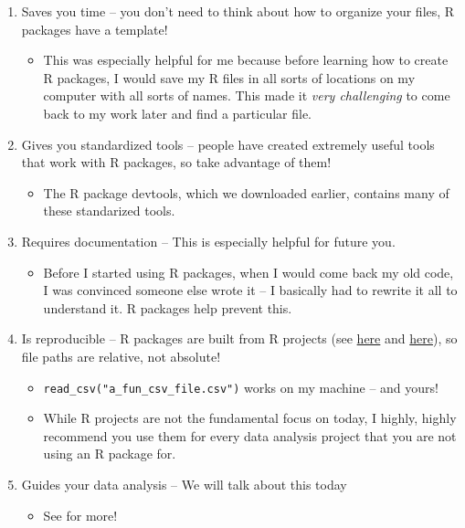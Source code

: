 \documentclass[
]{book}
\providecommand{\tightlist}{%
  \setlength{\itemsep}{0pt}\setlength{\parskip}{0pt}}
\begin{document}
\begin{enumerate}
\def\labelenumi{\arabic{enumi}.}
\tightlist
\item
  Saves you time -- you don't need to think about how to organize your files, R packages have a template!

  \begin{itemize}
  \tightlist
  \item
    This was especially helpful for me because before learning how to create R packages, I would save my R files in all sorts of locations on my computer with all sorts of names. This made it \emph{very challenging} to come back to my work later and find a particular file.
  \end{itemize}
\item
  Gives you standardized tools -- people have created extremely useful tools that work with R packages, so take advantage of them!

  \begin{itemize}
  \tightlist
  \item
    The R package devtools, which we downloaded earlier, contains many of these standarized tools.
  \end{itemize}
\item
  Requires documentation -- This is especially helpful for future you.

  \begin{itemize}
  \tightlist
  \item
    Before I started using R packages, when I would come back my old code, I was convinced someone else wrote it -- I basically had to rewrite it all to understand it. R packages help prevent this.
  \end{itemize}
\item
  Is reproducible -- R packages are built from R projects (see \href{https://r4ds.had.co.nz/workflow-projects.html}{here} and \href{https://support.rstudio.com/hc/en-us/articles/200526207-Using-Projects}{here}), so file paths are relative, not absolute!

  \begin{itemize}
  \tightlist
  \item
    \texttt{read\_csv("a\_fun\_csv\_file.csv")} works on my machine -- and yours!
  \item
    While R projects are not the fundamental focus on today, I highly, highly recommend you use them for every data analysis project that you are not using an R package for.
  \end{itemize}
\item
  Guides your data analysis -- We will talk about this today

  \begin{itemize}
  \tightlist
  \item
    See \citet{marwick2018packaging} for more!
  \end{itemize}
\end{enumerate}
\end{document}
